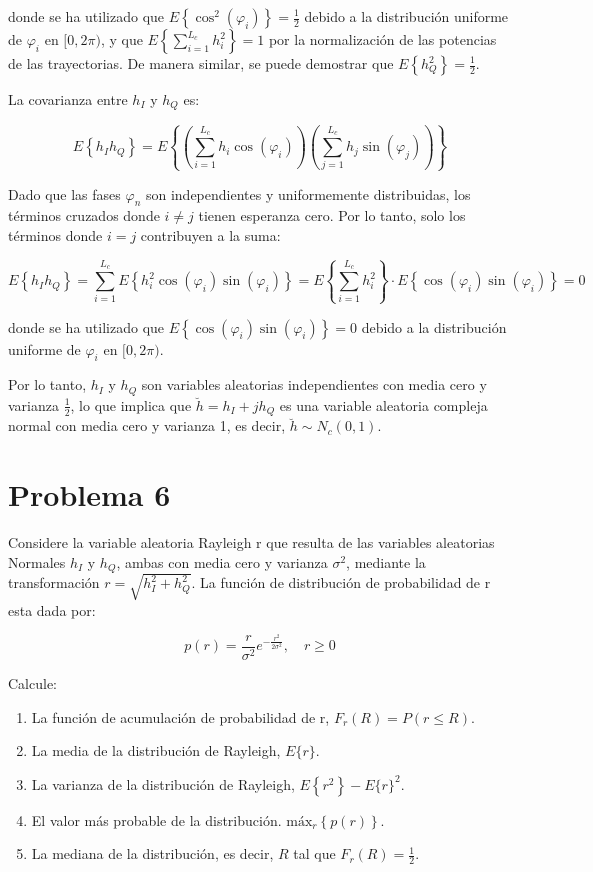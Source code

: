 \documentclass[11pt]{article}
\begin{document}
donde se ha utilizado que \(E\left\{\cos^2(\varphi_i)\right\} = \frac{1}{2}\) debido a la distribución uniforme de \(\varphi_i\) en \([0, 2\pi)\), y que \(E\left\{\sum_{i = 1}^{L_c} h_i^2 \right\} = 1\) por la normalización de las potencias de las trayectorias. De manera similar, se puede demostrar que \(E\left\{h_Q^2\right\} = \frac{1}{2}\).


La covarianza entre \(h_I\) y \(h_Q\) es:

\[
E\left\{h_I h_Q\right\} = E\left\{\left(\sum_{i=1}^{L_c} h_i \cos(\varphi_i)\right) \left(\sum_{j=1}^{L_c} h_j \sin(\varphi_j)\right)\right\}
\]

Dado que las fases \(\varphi_n\) son independientes y uniformemente distribuidas, los términos cruzados donde \(i \neq j\) tienen esperanza cero. Por lo tanto, solo los términos donde \(i = j\) contribuyen a la suma:

\[
E\left\{h_I h_Q\right\} = \sum_{i=1}^{L_c} E\left\{h_i^2 \cos(\varphi_i) \sin(\varphi_i)\right\} = E\left\{\sum_{i=1}^{L_c} h_i^2 \right\}  \cdot E\left\{\cos(\varphi_i) \sin(\varphi_i)\right\} = 0
\]

donde se ha utilizado que \(E\left\{\cos(\varphi_i) \sin(\varphi_i)\right\} = 0\) debido a la distribución uniforme de \(\varphi_i\) en \([0, 2\pi)\).

Por lo tanto, \(h_I\) y \(h_Q\) son variables aleatorias independientes con media cero y varianza \(\frac{1}{2}\), lo que implica que \(\breve{h} = h_I + j h_Q\) es una variable aleatoria compleja normal con media cero y varianza 1, es decir, \(\breve{h} \sim N_c(0,1)\).

\section*{Problema 6}

Considere la variable aleatoria Rayleigh r que resulta de las variables
aleatorias Normales \(h_I\) y \(h_Q\), ambas con media cero y varianza \(\sigma^2\), mediante la transformación \(r = \sqrt{h_I^2 + h_Q^2}\). La función de distribución de probabilidad de r esta dada por:

\begin{equation*}
    p(r) = \frac{r}{\sigma^2} e^{-\frac{r^2}{2\sigma^2}}, \quad r \geq 0
\end{equation*}

Calcule:

\begin{enumerate}
    \item La función de acumulación de probabilidad de r, \(F_r(R) = P(r \leq R)\).
    \item La media de la distribución de Rayleigh, \(E\{r\}\).
    \item La varianza de la distribución de Rayleigh, \(E\left\{r^2\right\} - E\{r\}^2\).
    \item El valor más probable de la distribución. \(\text{máx}_r \left\{p(r)\right\}\).
    \item La mediana de la distribución, es decir, \(R\) tal que \(F_r(R) = \frac{1}{2}\).
\end{enumerate}
\end{document}
